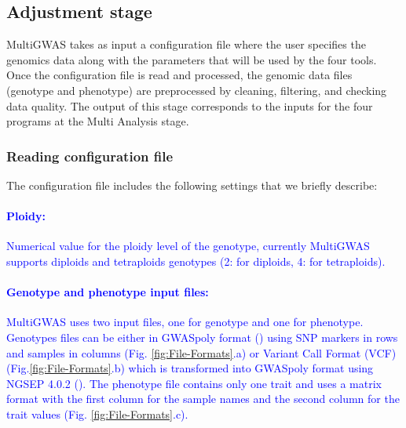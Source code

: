 \documentclass{article}
\begin{document}


\subsection{Adjustment stage}

MultiGWAS takes as input a configuration file where the user specifies the genomics data along with the parameters that will be used by the four tools. Once the configuration file is read and processed, the genomic data files (genotype and phenotype) are preprocessed by cleaning, filtering, and checking data quality. The output of this stage corresponds to the inputs for the four programs at the Multi Analysis stage.


\subsubsection{Reading configuration file\label{section-Reading-configuration-file}}

The configuration file includes the following settings that we briefly describe:%

\paragraph{\textcolor{blue}{Ploidy:}}

\textcolor{blue}{Numerical value for the ploidy level of the genotype, currently MultiGWAS supports diploids and tetraploids genotypes (2: for diploids, 4: for tetraploids).}

\paragraph{\textcolor{blue}{Genotype and phenotype input files:}}

\textcolor{blue}{MultiGWAS uses two input files, one for genotype and one for phenotype. Genotypes files can be either in GWASpoly format (\cite{Rosyara2016}) using SNP markers in rows and samples in columns (Fig. \ref{fig:File-Formats}.a) or Variant Call Format (VCF) (Fig.\ref{fig:File-Formats}.b) which is transformed into GWASpoly format using NGSEP 4.0.2 (\cite{Duitama2019}). The phenotype file contains only one trait and uses a matrix format with the first column for the sample names and the second column for the trait values (Fig. \ref{fig:File-Formats}.c).}
\end{document}
